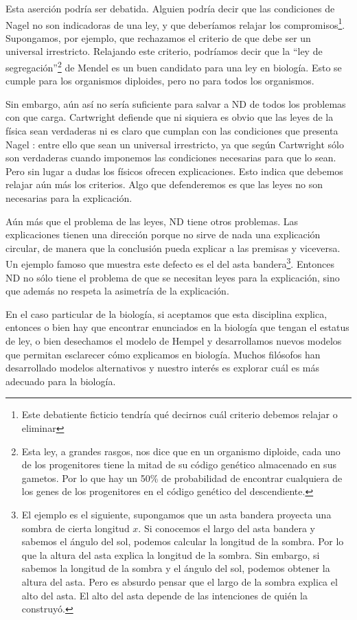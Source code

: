 {Esta aserción podría ser debatida. Alguien podría decir que las condiciones de Nagel no son indicadoras de una ley, y que deberíamos relajar los compromisos\footnote{Este debatiente ficticio tendría qué decirnos cuál criterio debemos relajar o eliminar}. Supongamos, por ejemplo, que rechazamos el criterio de que debe ser un universal irrestricto. Relajando este criterio, podríamos decir que la ``ley de segregación''\footnote{Esta ley, a grandes rasgos, nos dice que en un organismo diploide, cada uno de los progenitores tiene la mitad de su código genético almacenado en sus gametos. Por lo que hay un 50\% de probabilidad de encontrar cualquiera de los genes de los progenitores en el código genético del descendiente.} de Mendel es un buen candidato para una ley en biología. Esto se cumple para los organismos diploides, pero no para todos los organismos.

Sin embargo, aún así no sería suficiente para salvar a ND de todos los problemas con que carga. Cartwright defiende que ni siquiera es obvio que las leyes de la física sean verdaderas ni es claro que cumplan con las condiciones que presenta Nagel \cite{Cartwright1983}: entre ello que sean un universal irrestricto, ya que según Cartwright sólo son verdaderas cuando imponemos las condiciones necesarias para que lo sean. Pero sin lugar a dudas los físicos ofrecen explicaciones. Esto indica que debemos relajar aún más los criterios. Algo que defenderemos es que las leyes no son necesarias para la explicación.

Aún más que el problema de las leyes, ND tiene otros problemas. Las explicaciones tienen una dirección porque no sirve de nada una explicación circular, de manera que la conclusión pueda explicar a las premisas y viceversa. Un ejemplo famoso que muestra este defecto es el del asta bandera\footnote{El ejemplo es el siguiente, supongamos que un asta bandera proyecta una sombra de cierta longitud $x$. Si conocemos el largo del asta bandera y sabemos el ángulo del sol, podemos calcular la longitud de la sombra. Por lo que la altura del asta explica la longitud de la sombra. Sin embargo, si sabemos la longitud de la sombra y el ángulo del sol, podemos obtener la altura del asta. Pero es absurdo pensar que el largo de la sombra explica el alto del asta. El alto del asta depende de las intenciones de quién la construyó.}. Entonces ND no sólo tiene el problema de que se necesitan leyes para la explicación, sino que además no respeta la asimetría de la explicación.

En el caso particular de la biología, si aceptamos que esta disciplina explica, entonces o bien hay que encontrar enunciados en la biología que tengan el estatus de ley, o bien  desechamos el modelo de Hempel y desarrollamos nuevos modelos que permitan esclarecer cómo explicamos en biología. Muchos filósofos han desarrollado modelos alternativos y nuestro interés es explorar cuál es más adecuado para la biología.

}
